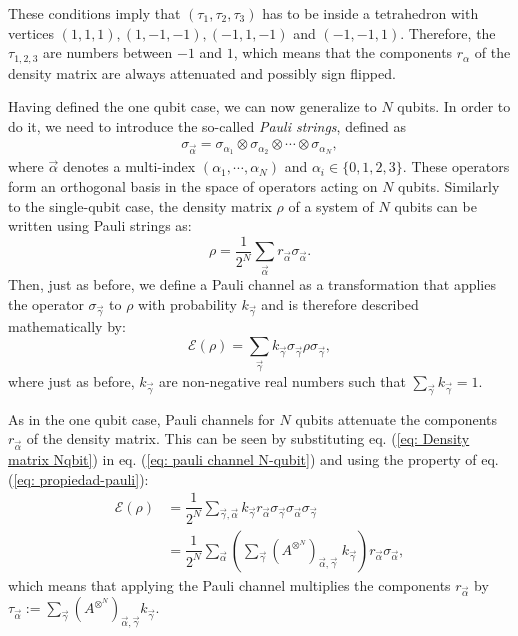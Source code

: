 \documentclass[10pt,letterpaper]{article} %
\begin{document}
These conditions imply that $(\tau_1,\tau_2,\tau_3)$
has to be inside a tetrahedron with
vertices $(1,1,1), (1,-1,-1),(-1,1,-1)$ and $(-1,-1,1)$. 
Therefore, the $\tau_{1,2,3}$ are numbers between 
$-1$ and $1$, which means that the components
$r_{\alpha}$ of the density matrix are always 
attenuated and possibly sign flipped.

Having defined the one qubit case,  we can now generalize to $N$ qubits.
In order to do it, we need to introduce the so-called \textit{Pauli strings}, defined as
\begin{eqnarray}
\label{eq: Pauli string}
\sigma_{\vec{\alpha}} = \sigma_{\alpha_1} \otimes \sigma_{\alpha_2}\otimes \cdots \otimes \sigma_{\alpha_N},
\end{eqnarray}
where $\vec{\alpha}$ denotes a multi-index $(\alpha_1, \cdots, \alpha_N)$
 and $\alpha_i \in \{0,1,2,3\}$. 
These operators form an orthogonal basis in the space of operators acting on $N$ qubits. 
 Similarly to the single-qubit case, the density matrix $\rho$ 
of a system of $N$ qubits can be written using Pauli strings as:
\begin{equation}
\label{eq:  Density matrix Nqbit}
\rho = \dfrac{1}{2^N} \sum_{\vec{\alpha}} r_{\vec{\alpha}} \sigma_{\vec{\alpha}}.
\end{equation}
Then, just as before, we define a Pauli channel as a transformation that applies 
the operator $\sigma_{\vec{\gamma}}$ to $\rho$ with probability $k_{\vec{\gamma}}$
and is therefore described mathematically by:
\begin{equation}
\label{eq: pauli channel N-qubit}
\mathcal{E}(\rho) = \sum_{\vec{\gamma}} k_{\vec{\gamma}} \sigma_{\vec{\gamma}} \rho \sigma_{\vec{\gamma}},
\end{equation}
where just as before, $k_{\vec{\gamma}}$ are non-negative real numbers such 
that $\sum_{\vec{\gamma}} k_{\vec{\gamma}}=1$.

As in the one qubit case, Pauli channels for $N$ qubits 
attenuate the components $r_{\vec{\alpha}}$ of the density matrix.
This can be seen by substituting eq. (\ref{eq:  Density matrix Nqbit}) in eq. (\ref{eq: pauli channel N-qubit})
and using the property of eq. (\ref{eq: propiedad-pauli}):
\begin{align*}
\mathcal{E}(\rho) &= \dfrac{1}{2^N} \sum_{\vec{\gamma},\vec{\alpha}} k_{\vec{\gamma}} r_{\vec{\alpha}} \sigma_{\vec{\gamma}} \sigma_{\vec{\alpha}} \sigma_{\vec{\gamma}} \\
& = \dfrac{1}{2^N} \sum_{\vec{\alpha}} \left( \sum_{\vec{\gamma}} (A^{\otimes^N})_{\vec{\alpha},\vec{\gamma}} \; k_{\vec{\gamma}} \right) r_{\vec{\alpha}} \sigma_{\vec{\alpha}},
\end{align*}
which means that applying the Pauli channel multiplies the 
components $r_{\vec{\alpha}}$ by $\tau_{\vec{\alpha}} := \sum_{\vec{\gamma}} (A^{\otimes^N})_{\vec{\alpha},\vec{\gamma}} k_{\vec{\gamma}}$.
\end{document}
